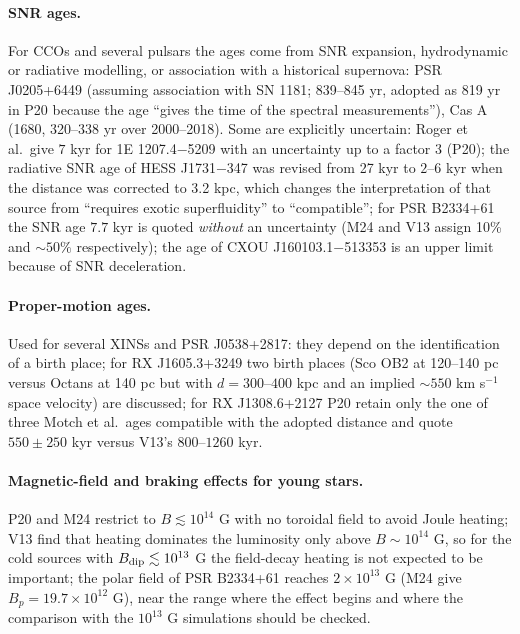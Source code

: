 \documentclass[11pt,a4paper]{article}
\begin{document}
\paragraph{SNR ages.} For CCOs and several pulsars the ages come from SNR expansion, hydrodynamic or radiative modelling, or association with a historical supernova: PSR J0205+6449 (assuming association with SN 1181; 839--845 yr, adopted as 819 yr in P20 because the age ``gives the time of the spectral measurements''), Cas A (1680, 320--338 yr over 2000--2018). Some are explicitly uncertain: Roger et al.\ give $7$ kyr for 1E 1207.4$-$5209 with an uncertainty up to a factor 3 (P20); the radiative SNR age of HESS J1731$-$347 was revised from 27 kyr to $2$--$6$ kyr when the distance was corrected to 3.2 kpc, which changes the interpretation of that source from ``requires exotic superfluidity'' to ``compatible''; for PSR B2334+61 the SNR age $7.7$ kyr is quoted \emph{without} an uncertainty (M24 and V13 assign 10\% and $\sim50\%$ respectively); the age of CXOU J160103.1$-$513353 is an upper limit because of SNR deceleration.
\paragraph{Proper-motion ages.} Used for several XINSs and PSR J0538+2817: they depend on the identification of a birth place; for RX J1605.3+3249 two birth places (Sco OB2 at 120--140 pc versus Octans at 140 pc but with $d=300$--$400$ kpc and an implied $\sim550$ km s$^{-1}$ space velocity) are discussed; for RX J1308.6+2127 P20 retain only the one of three Motch et al.\ ages compatible with the adopted distance and quote $550\pm250$ kyr versus V13's $800$--$1260$ kyr.
\paragraph{Magnetic-field and braking effects for young stars.} P20 and M24 restrict to $B\lesssim10^{14}$ G with no toroidal field to avoid Joule heating; V13 find that heating dominates the luminosity only above $B\sim10^{14}$ G, so for the cold sources with $B_{\rm dip}\lesssim10^{13}$ G the field-decay heating is not expected to be important; the polar field of PSR B2334+61 reaches $2\times10^{13}$ G (M24 give $B_p=19.7\times10^{12}$ G), near the range where the effect begins and where the comparison with the $10^{13}$ G simulations should be checked.
\end{document}
